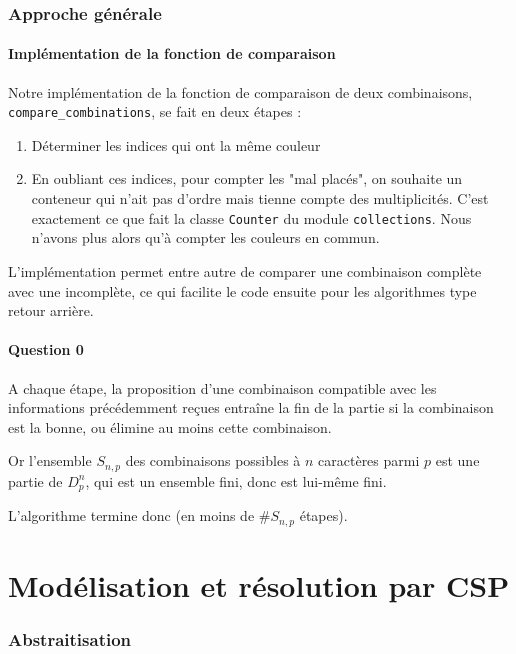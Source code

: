 \documentclass[a4paper, 12pt]{report}
\newcommand{\py}[1]{\texttt{#1}}
\begin{document}
\section*{Approche générale}

\subsection*{Implémentation de la fonction de comparaison}

Notre implémentation de la fonction de comparaison de deux combinaisons, \py{compare_combinations}, se fait en deux étapes :

\begin{enumerate}
	\item Déterminer les indices qui ont la même couleur
	
	\item En oubliant ces indices, pour compter les "mal placés", on souhaite un conteneur qui n'ait pas d'ordre mais tienne compte des multiplicités. C'est exactement ce que fait la classe \py{Counter} du module \py{collections}. Nous n'avons plus alors qu'à compter les couleurs en commun.
\end{enumerate}

L'implémentation permet entre autre de comparer une combinaison complète avec une incomplète, ce qui facilite le code ensuite pour les algorithmes type retour arrière.

\subsection*{Question 0}
A chaque étape, la proposition d'une combinaison compatible avec les informations précédemment reçues entraîne la fin de la partie si la combinaison est la bonne, ou élimine au moins cette combinaison. 

Or l'ensemble $S_{n, p}$ des combinaisons possibles à $n$ caractères parmi $p$ est une partie de $D_p^n$, qui est un ensemble fini, donc est lui-même fini.

L'algorithme termine donc (en moins de $\#S_{n, p}$ étapes).



\part*{Modélisation et résolution par CSP}

\section*{Abstraitisation}
\end{document}
